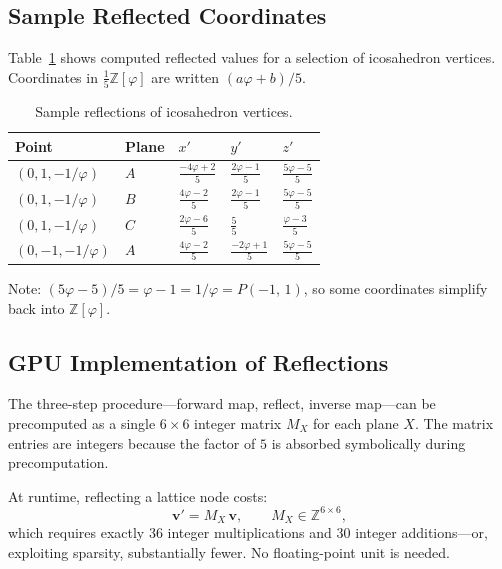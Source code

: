 \documentclass[12pt]{article}
\theoremstyle{definition}
\theoremstyle{remark}
\newcommand{\Z}{\mathbb{Z}}
\newcommand{\Zphi}{\mathbb{Z}[\varphi]}
\newcommand{\Phib}[2]{P(#1,\,#2)}
\begin{document}
\subsection{Sample Reflected Coordinates}

Table~\ref{tab:reflect} shows computed reflected values for a selection
of icosahedron vertices.  Coordinates in $\tfrac{1}{5}\Zphi$ are
written $(a\varphi+b)/5$.

\begin{table}[h]
\centering
\caption{Sample reflections of icosahedron vertices.}
\label{tab:reflect}
\begin{tabular}{lllll}
\toprule
Point & Plane & $x'$ & $y'$ & $z'$ \\
\midrule
$(0,1,-1/\varphi)$ & $A$ & $\frac{-4\varphi+2}{5}$ & $\frac{2\varphi-1}{5}$ & $\frac{5\varphi-5}{5}$ \\[4pt]
$(0,1,-1/\varphi)$ & $B$ & $\frac{4\varphi-2}{5}$  & $\frac{2\varphi-1}{5}$ & $\frac{5\varphi-5}{5}$ \\[4pt]
$(0,1,-1/\varphi)$ & $C$ & $\frac{2\varphi-6}{5}$  & $\frac{5}{5}$          & $\frac{\varphi-3}{5}$  \\[4pt]
$(0,-1,-1/\varphi)$& $A$ & $\frac{4\varphi-2}{5}$  & $\frac{-2\varphi+1}{5}$& $\frac{5\varphi-5}{5}$ \\
\bottomrule
\end{tabular}
\end{table}

Note: $(5\varphi-5)/5 = \varphi - 1 = 1/\varphi = \Phib{-1}{1}$, so
some coordinates simplify back into $\Zphi$.

\subsection{GPU Implementation of Reflections}

The three-step procedure---forward map, reflect, inverse map---can be
precomputed as a single $6\times 6$ integer matrix $M_X$ for each
plane $X$.  The matrix entries are integers because the factor of $5$
is absorbed symbolically during precomputation.

At runtime, reflecting a lattice node costs:
\[
  \mathbf{v}' = M_X\,\mathbf{v},
  \qquad M_X \in \Z^{6\times 6},
\]
which requires exactly 36 integer multiplications and 30 integer
additions---or, exploiting sparsity, substantially fewer.  No
floating-point unit is needed.
\end{document}
